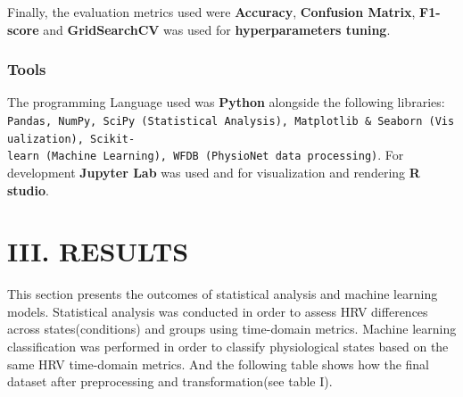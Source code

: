 \documentclass[
  11pt,
]{ieee}
\begin{document}
Finally, the evaluation metrics used were \textbf{Accuracy},
\textbf{Confusion Matrix}, \textbf{F1-score} and \textbf{GridSearchCV}
was used for \textbf{hyperparameters tuning}.

\subsubsection{Tools}\label{tools}

\vspace{0.8em}

The programming Language used was \textbf{Python} alongside the
following libraries:
\texttt{Pandas,\ NumPy,\ SciPy\ (Statistical\ Analysis),\ Matplotlib\ \&\ Seaborn\ (Visualization),\ Scikit-learn\ (Machine\ Learning),\ WFDB\ (PhysioNet\ data\ processing)}.
For development \textbf{Jupyter Lab} was used and for visualization and
rendering \textbf{R studio}.

\section{III. RESULTS}\label{iii.-results}

This section presents the outcomes of statistical analysis and machine
learning models. Statistical analysis was conducted in order to assess
HRV differences across states(conditions) and groups using time-domain
metrics. Machine learning classification was performed in order to
classify physiological states based on the same HRV time-domain metrics.
And the following table shows how the final dataset after preprocessing
and transformation(see table I).

\begin{table}[!h]
\centering
\caption{Sample HRV metrics: First 10}
\centering
{}
\end{table}
\end{document}
